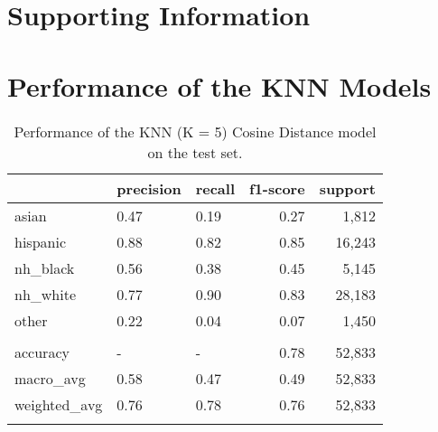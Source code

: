 \documentclass[12pt, letterpaper]{article}
\begin{document}
\appendix
\renewcommand{\thesection}{SI \arabic{section}}
\renewcommand\thetable{\thesection.\arabic{table}}  
\renewcommand\thefigure{\thesection.\arabic{figure}}
\section*{Supporting Information}\label{si}

\section{Performance of the KNN Models}\label{knn_perf}

\begin{table}[h!]
\centering
\caption{Performance of the KNN (K = 5) Cosine Distance model on the test set.}
\begin{tabular}{lllrr}
\hline
              & precision   & recall   &   f1-score &   support \\
\hline
 asian        & 0.47        & 0.19     &       0.27 &      1,812 \\
 hispanic     & 0.88        & 0.82     &       0.85 &     16,243 \\
 nh\_black     & 0.56        & 0.38     &       0.45 &      5,145 \\
 nh\_white     & 0.77        & 0.90     &       0.83 &     28,183 \\
 other        & 0.22        & 0.04     &       0.07 &      1,450 \\
              &             &          &            &           \\
 accuracy     & -           & -        &       0.78 &     52,833 \\
 macro\_avg    & 0.58        & 0.47     &       0.49 &     52,833 \\
 weighted\_avg & 0.76        & 0.78     &       0.76 &     52,833 \\
\hline
\label{table:knn_last_name}
\end{tabular}
\end{table}
\end{document}
